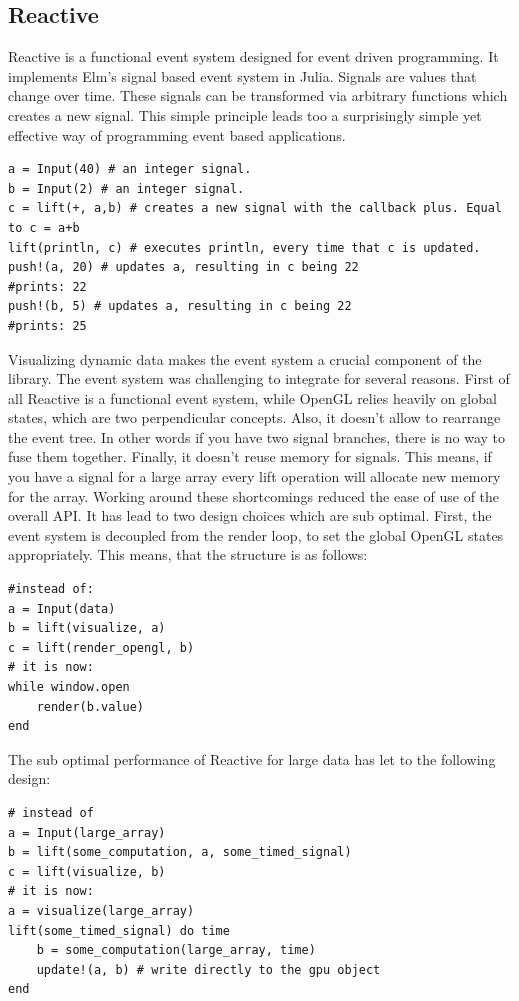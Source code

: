 \subsection{Reactive}

Reactive is a functional event system designed for event driven programming.
It implements Elm's signal based event system in Julia.
Signals are values that change over time.
These signals can be transformed via arbitrary functions which creates a new signal. 
This simple principle leads too a surprisingly simple yet effective way of programming event based applications.
\begin{lstlisting}
a = Input(40) # an integer signal.
b = Input(2) # an integer signal.
c = lift(+, a,b) # creates a new signal with the callback plus. Equal to c = a+b
lift(println, c) # executes println, every time that c is updated. 
push!(a, 20) # updates a, resulting in c being 22
#prints: 22
push!(b, 5) # updates a, resulting in c being 22
#prints: 25
\end{lstlisting}
Visualizing dynamic data makes the event system a crucial component of the library.
The event system was challenging to integrate for several reasons.
First of all Reactive is a functional event system, while OpenGL relies heavily on global states, which are two perpendicular concepts.
Also, it doesn't allow to rearrange the event tree. In other words if you have two signal branches, there is no way to fuse them together.
Finally, it doesn't reuse memory for signals. This means, if you have a signal for a large array every lift operation will allocate new memory for the array.
Working around these shortcomings reduced the ease of use of the overall API.
It has lead to two design choices which are sub optimal.
First, the event system is decoupled from the render loop, to set the global OpenGL states appropriately.
This means, that the structure is as follows:
\begin{lstlisting}
#instead of:
a = Input(data)
b = lift(visualize, a)
c = lift(render_opengl, b)
# it is now:
while window.open
	render(b.value)
end
\end{lstlisting}
The sub optimal performance of Reactive for large data has let to the following design:
\begin{lstlisting}
# instead of
a = Input(large_array)
b = lift(some_computation, a, some_timed_signal)
c = lift(visualize, b)
# it is now:
a = visualize(large_array)
lift(some_timed_signal) do time
	b = some_computation(large_array, time)
	update!(a, b) # write directly to the gpu object
end
\end{lstlisting}

